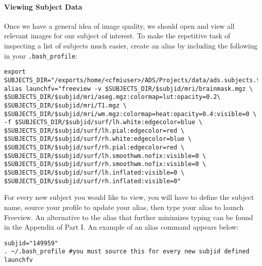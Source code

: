 \documentclass[paper=a4, fontsize=11pt]{scrartcl} %
\numberwithin{equation}{section} %
\numberwithin{figure}{section} %
\numberwithin{table}{section} %
\begin{document}
\paragraph{Viewing Subject Data} Once we have a general idea of image quality, we should open and view all relevant images for our subject of interest. To make the repetitive task of inspecting a list of subjects much easier, create an alias by including the following in your \texttt{.bash\_profile}:

\begin{lstlisting}
export SUBJECTS_DIR="/exports/home/<cfmiuser>/ADS/Projects/data/ads.subjects.tutorial"
alias launchfv="freeview -v $SUBJECTS_DIR/$subjid/mri/brainmask.mgz \                                                                               
$SUBJECTS_DIR/$subjid/mri/aseg.mgz:colormap=lut:opacity=0.2\                                                                                        
$SUBJECTS_DIR/$subjid/mri/T1.mgz \                                                                                                                  
$SUBJECTS_DIR/$subjid/mri/wm.mgz:colormap=heat:opacity=0.4:visible=0 \                                                                              
-f $SUBJECTS_DIR/$subjid/surf/lh.white:edgecolor=blue \                                                                                             
$SUBJECTS_DIR/$subjid/surf/lh.pial:edgecolor=red \                                                                                                  
$SUBJECTS_DIR/$subjid/surf/rh.white:edgecolor=blue \                                                                                                
$SUBJECTS_DIR/$subjid/surf/rh.pial:edgecolor=red \                                                                                                  
$SUBJECTS_DIR/$subjid/surf/lh.smoothwm.nofix:visible=0 \                                                                                            
$SUBJECTS_DIR/$subjid/surf/rh.smoothwm.nofix:visible=0 \                                                                                            
$SUBJECTS_DIR/$subjid/surf/lh.inflated:visible=0 \                                                                                                  
$SUBJECTS_DIR/$subjid/surf/rh.inflated:visible=0"
\end{lstlisting}

For every new subject you would like to view, you will have to define the subject name, source your profile to update your alias, then type your alias to launch Freeview. An alternative to the alias that further minimizes typing can be found in the Appendix of Part I. An example of an alias command appears below:
~\\
\begin{lstlisting}[frame=single]
subjid="149959"
. ~/.bash_profile #you must source this for every new subjid defined
launchfv
\end{lstlisting}
\end{document}
